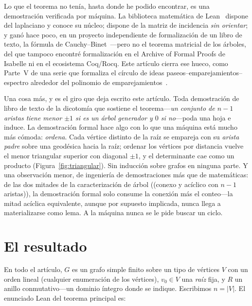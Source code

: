 \documentclass[11pt]{article}
\begin{document}
Lo que el teorema no ten\'ia, hasta donde he podido encontrar, es una demostraci\'on verificada
por m\'aquina. La biblioteca matem\'atica de Lean~\cite{Mathlib} dispone del laplaciano y conoce
su n\'ucleo; dispone de la matriz de incidencia \emph{sin orientar}; y gan\'o hace poco, en un
proyecto independiente de formalizaci\'on de un libro de texto, la f\'ormula de
Cauchy--Binet~\cite{Grinberg,FaabianRepo}---pero no el teorema matricial de los \'arboles, del
que tampoco encontr\'e formalizaci\'on en el Archive of Formal Proofs de Isabelle ni en el
ecosistema Coq/Rocq. Este art\'iculo cierra ese hueco, como Parte~V de una serie que formaliza
el c\'irculo de ideas paseos--emparejamientos--espectro alrededor del polinomio de
emparejamientos~\cite{PartI,PartII,Bass,PartIII,PartIV}.

Una cosa m\'as, y es el giro que deja escrito este art\'iculo. Toda demostraci\'on de libro de
texto de la dicotom\'ia que sostiene el teorema---\emph{un conjunto de $n-1$ aristas tiene menor
$\pm1$ si es un \'arbol generador y $0$ si no}---poda una hoja e induce. La demostraci\'on
formal hace algo con lo que una m\'aquina est\'a mucho m\'as c\'omoda: \emph{ordena}. Cada
v\'ertice distinto de la ra\'iz se empareja con su \emph{arista padre} sobre una geod\'esica
hacia la ra\'iz; ordenar los v\'ertices por distancia vuelve el menor triangular superior con
diagonal $\pm1$, y el determinante cae como un producto (Figura~\ref{fig:triangular}). Sin
inducci\'on sobre grafos en ninguna parte. Y una observaci\'on menor, de ingenier\'ia de
demostraciones m\'as que de matem\'aticas: de las dos mitades de la caracterizaci\'on de
\'arbol ((conexo y ac\'iclico con $n-1$ aristas)), la demostraci\'on formal solo consume la
conexi\'on m\'as el conteo---la mitad ac\'iclica equivalente, aunque por supuesto implicada,
nunca llega a materializarse como lema. A la m\'aquina nunca se le pide buscar un ciclo.

\section{El resultado}
\label{sec:result}

En todo el art\'iculo, $G$ es un grafo simple finito sobre un tipo de v\'ertices $V$ con un
orden lineal (cualquier enumeraci\'on de los v\'ertices), $v_0\in V$ una \emph{ra\'iz} fija, y
$R$ un anillo conmutativo---un dominio \'integro donde se indique. Escribimos $n=|V|$. El
enunciado Lean del teorema principal es:
\end{document}
